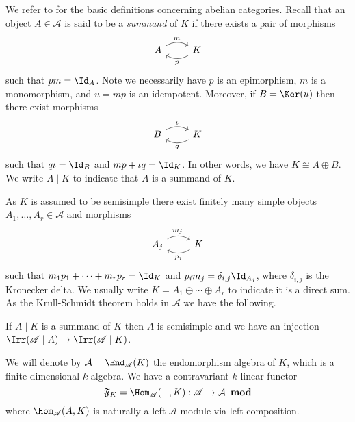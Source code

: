\documentclass[eqthmnum,nocolour,skinny]{jt-calcs}
\newcommand{\lmod}[1]{\ensuremath{#1\text{--{\bf mod}}}}
\begin{document}
\begin{pa}\label{pa:semisimple-obj}
We refer to \cite[Chapter 1]{etingof-gelaki-nikshych-ostrik:2015:tensor-categories} for the basic definitions concerning abelian categories. Recall that an object $A \in \mathscr{A}$ is said to be a \emph{summand} of $K$ if there exists a pair of morphisms
\begin{equation*}
\begin{tikzcd}
A \arrow[r,bend left,"m"] & K \arrow[l,bend left,"p"]
\end{tikzcd}
\end{equation*}
such that $pm = \Id_A$. Note we necessarily have $p$ is an epimorphism, $m$ is a monomorphism, and $u = mp$ is an idempotent. Moreover, if $B = \Ker(u)$ then there exist morphisms
\begin{equation*}
\begin{tikzcd}
B \arrow[r,bend left,"\iota"] & K \arrow[l,bend left,"q"]
\end{tikzcd}
\end{equation*}
such that $q\iota = \Id_B$ and $mp + \iota q = \Id_K$. In other words, we have $K \cong A \oplus B$. We write $A \mid K$ to indicate that $A$ is a summand of $K$.
\end{pa}

\begin{pa}
As $K$ is assumed to be semisimple there exist finitely many simple objects $A_1,\dots,A_r \in \mathscr{A}$ and morphisms
\begin{equation*}
\begin{tikzcd}
A_j \arrow[r,bend left,pos=0.45,"m_j"] & K \arrow[l,bend left,pos=0.51,"p_j"]
\end{tikzcd}
\end{equation*}
such that $m_1p_1+\cdots+m_rp_r = \Id_K$ and $p_im_j = \delta_{i,j}\Id_{A_j}$, where $\delta_{i,j}$ is the Kronecker delta. We usually write $K = A_1\oplus\cdots\oplus A_r$ to indicate it is a direct sum. As the Krull-Schmidt theorem holds in $\mathscr{A}$ we have the following.
\end{pa}

\begin{lem}\label{lem:semisimple-summands}
If $A \mid K$ is a summand of $K$ then $A$ is semisimple and we have an injection $\Irr(\mathscr{A}\mid A) \to \Irr(\mathscr{A}\mid K)$.
\end{lem}

\begin{pa}
We will denote by $\mathcal{A} = \End_{\mathscr{A}}(K)$ the endomorphism algebra of $K$, which is a finite dimensional $k$-algebra. We have a contravariant $k$-linear functor
\begin{equation*}
\mathfrak{F}_K = \Hom_{\mathscr{A}}(-,K) : \mathscr{A} \to \lmod{\mathcal{A}}
\end{equation*}
where $\Hom_{\mathscr{A}}(A,K)$ is naturally a left $\mathcal{A}$-module via left composition.
\end{pa}
\end{document}
